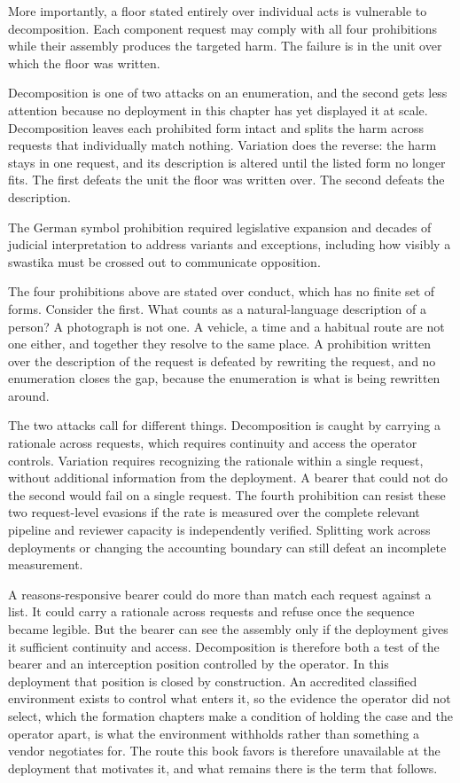 More importantly, a floor stated entirely over individual acts is vulnerable to decomposition. Each component request may comply with all four prohibitions while their assembly produces the targeted harm. The failure is in the unit over which the floor was written.


Decomposition is one of two attacks on an enumeration, and the second gets less attention because no deployment in this chapter has yet displayed it at scale. Decomposition leaves each prohibited form intact and splits the harm across requests that individually match nothing. Variation does the reverse: the harm stays in one request, and its description is altered until the listed form no longer fits. The first defeats the unit the floor was written over. The second defeats the description.

The German symbol prohibition required legislative expansion and decades of judicial interpretation to address variants and exceptions, including how visibly a swastika must be crossed out to communicate opposition.

The four prohibitions above are stated over conduct, which has no finite set of forms. Consider the first. What counts as a natural-language description of a person? A photograph is not one. A vehicle, a time and a habitual route are not one either, and together they resolve to the same place. A prohibition written over the description of the request is defeated by rewriting the request, and no enumeration closes the gap, because the enumeration is what is being rewritten around.

The two attacks call for different things. Decomposition is caught by carrying a rationale across requests, which requires continuity and access the operator controls. Variation requires recognizing the rationale within a single request, without additional information from the deployment. A bearer that could not do the second would fail on a single request. The fourth prohibition can resist these two request-level evasions if the rate is measured over the complete relevant pipeline and reviewer capacity is independently verified. Splitting work across deployments or changing the accounting boundary can still defeat an incomplete measurement.


A reasons-responsive bearer could do more than match each request against a list. It could carry a rationale across requests and refuse once the sequence became legible. But the bearer can see the assembly only if the deployment gives it sufficient continuity and access. Decomposition is therefore both a test of the bearer and an interception position controlled by the operator. In this deployment that position is closed by construction. An accredited classified environment exists to control what enters it, so the evidence the operator did not select, which the formation chapters make a condition of holding the case and
the operator apart, is what the environment withholds rather than something a vendor negotiates for. The route this book favors is therefore unavailable at the deployment that motivates it, and what remains there is the term that follows.

